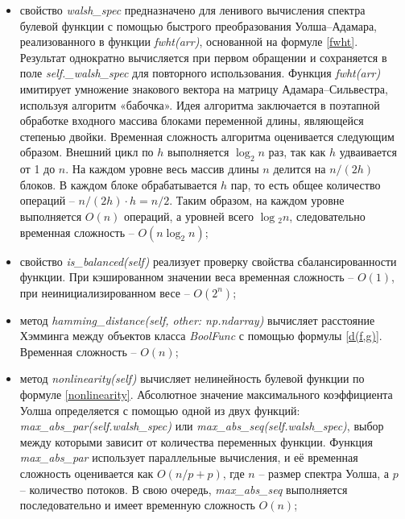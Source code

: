\begin{itemize}
    Временная сложность алгоритма оценивается следующим образом. Внешний цикл выполняется $n$ раз (по разрядам). Во вложенном цикле \textit{block\_start} проходит по всем $2^n$ элементам с шагом $2^i+1$, т.е. всего выполняется $2^{n−i−1}$ итераций. В каждой итерации этого цикла внутренний цикл по $j$ выполняется $2^i$ раз. Таким образом, общее число операций на каждом шаге $i$ составляет: $2^{n - i - 1} \cdot 2^i = 2^{n-1}$. Так как таких шагов $n$, общая сложность алгоритма – $O(n \cdot 2^n)$;
    \item свойство \textit{walsh\_spec} предназначено для ленивого вычисления спектра булевой функции с помощью быстрого преобразования Уолша–Адамара, реализованного в функции \textit{fwht(arr)}, основанной на формуле \eqref{fwht}. Результат однократно вычисляется при первом обращении и сохраняется в поле \textit{self.\_walsh\_spec} для повторного использования. Функция \textit{fwht(arr)} имитирует умножение знакового вектора на матрицу Адамара–Сильвестра, используя алгоритм «бабочка». Идея алгоритма заключается в поэтапной обработке входного массива блоками переменной длины, являющейся степенью двойки. Временная сложность алгоритма оценивается следующим образом. Внешний цикл по $h$ выполняется $\log_2n$ раз, так как $h$ удваивается от 1 до $n$. На каждом уровне весь массив длины $n$ делится на $n/(2h)$ блоков. В каждом блоке обрабатывается $h$ пар, то есть общее количество операций – $n / (2h) \cdot h = n/2$. Таким образом, на каждом уровне выполняется $O(n)$ операций, а уровней всего $\log⁡_2n$, следовательно временная сложность – $O(n\log_2n)$;
    \item свойство \textit{is\_balanced(self)} реализует проверку свойства сбалансированности функции. При кэшированном значении веса временная сложность – $O(1)$, при неинициализированном весе – $O(2^n)$;
    \item метод \textit{hamming\_distance(self, other: np.ndarray)} вычисляет расстояние Хэмминга между объектов класса \textit{BoolFunc} с помощью формулы \eqref{d(f,g)}. Временная сложность – $O(n)$; 
    \item метод \textit{nonlinearity(self)} вычисляет нелинейность булевой функции по формуле \eqref{nonlinearity}. Абсолютное значение максимального коэффициента Уолша определяется с помощью одной из двух функций: \textit{max\_abs\_par(self.walsh\_spec)} или \textit{max\_abs\_seq(self.walsh\_spec)}, выбор между которыми зависит от количества переменных функции. Функция \textit{max\_abs\_par} использует параллельные вычисления, и её временная сложность оценивается как $O(n/p + p)$, где $n$ – размер спектра Уолша, а $p$ – количество потоков. В свою очередь, \textit{max\_abs\_seq} выполняется последовательно и имеет временную сложность $O(n)$;

\end{itemize}
